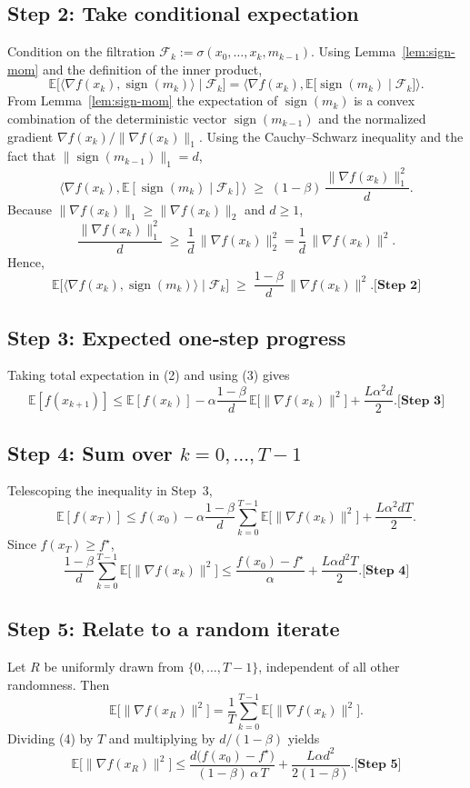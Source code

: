 \documentclass{article}
\newcommand{\E}{\mathbb{E}}
\newcommand{\sgn}{\operatorname{sign}}
\newcommand{\step}[1]{\textbf{[Step #1]}}
\begin{document}
\subsection*{Step 2: Take conditional expectation}
Condition on the filtration $\mathcal{F}_{k}:=\sigma(x_{0},\dots,x_{k},m_{k-1})$.
Using Lemma~\ref{lem:sign-mom} and the definition of the inner product,
\[
\E\!\bigl[\langle\nabla f(x_{k}),\sgn(m_{k})\rangle\mid\mathcal{F}_{k}\bigr]
   =\Big\langle\nabla f(x_{k}),
        \E\!\bigl[\sgn(m_{k})\mid\mathcal{F}_{k}\bigr]\Big\rangle .
\]
From Lemma~\ref{lem:sign-mom} the expectation of $\sgn(m_{k})$ is a convex
combination of the deterministic vector $\sgn(m_{k-1})$ and the normalized
gradient $\nabla f(x_{k})/\|\nabla f(x_{k})\|_{1}$.  Using the Cauchy–Schwarz
inequality and the fact that $\|\sgn(m_{k-1})\|_{1}=d$,
\[
\Big\langle\nabla f(x_{k}),
        \E[\sgn(m_{k})\mid\mathcal{F}_{k}]\Big\rangle
   \;\ge\;(1-\beta)\,\frac{\|\nabla f(x_{k})\|_{1}^{2}}{d}.
\tag{3}
\]
Because $\|\nabla f(x_{k})\|_{1}\ge\|\nabla f(x_{k})\|_{2}$ and $d\ge1$,
\[
\frac{\|\nabla f(x_{k})\|_{1}^{2}}{d}\;\ge\;\frac{1}{d}\,\|\nabla f(x_{k})\|_{2}^{2}
   =\frac{1}{d}\,\|\nabla f(x_{k})\|^{2}.
\]
Hence,
\[
\E\!\bigl[\langle\nabla f(x_{k}),\sgn(m_{k})\rangle\mid\mathcal{F}_{k}\bigr]
   \;\ge\;\frac{1-\beta}{d}\,\|\nabla f(x_{k})\|^{2}.
\step{2}
\]

\subsection*{Step 3: Expected one‑step progress}
Taking total expectation in (2) and using (3) gives
\[
\E[f(x_{k+1})]
\le \E[f(x_{k})]
   -\alpha\frac{1-\beta}{d}\,\E\!\bigl[\|\nabla f(x_{k})\|^{2}\bigr]
   +\frac{L\alpha^{2}d}{2}.
\step{3}
\]

\subsection*{Step 4: Sum over $k=0,\dots,T-1$}
Telescoping the inequality in Step~3,
\[
\E[f(x_{T})]
\le f(x_{0})
   -\alpha\frac{1-\beta}{d}\sum_{k=0}^{T-1}\E\!\bigl[\|\nabla f(x_{k})\|^{2}\bigr]
   +\frac{L\alpha^{2}dT}{2}.
\]
Since $f(x_{T})\ge f^{\star}$,
\[
\frac{1-\beta}{d}\sum_{k=0}^{T-1}\E\!\bigl[\|\nabla f(x_{k})\|^{2}\bigr]
\le
\frac{f(x_{0})-f^{\star}}{\alpha}
   +\frac{L\alpha d^{2}T}{2}.
\step{4}
\]

\subsection*{Step 5: Relate to a random iterate}
Let $R$ be uniformly drawn from $\{0,\dots,T-1\}$, independent of all other randomness.
Then
\[
\E\!\bigl[\|\nabla f(x_{R})\|^{2}\bigr]
   =\frac{1}{T}\sum_{k=0}^{T-1}\E\!\bigl[\|\nabla f(x_{k})\|^{2}\bigr].
\]
Dividing (4) by $T$ and multiplying by $d/(1-\beta)$ yields
\[
\E\!\bigl[\|\nabla f(x_{R})\|^{2}\bigr]
\le
\frac{d\bigl(f(x_{0})-f^{\star}\bigr)}{(1-\beta)\,\alpha\,T}
   +\frac{L\alpha d^{2}}{2(1-\beta)} .
\step{5}
\]
\end{document}
